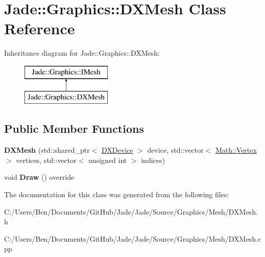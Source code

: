 \hypertarget{class_jade_1_1_graphics_1_1_d_x_mesh}{}\section{Jade\+:\+:Graphics\+:\+:D\+X\+Mesh Class Reference}
\label{class_jade_1_1_graphics_1_1_d_x_mesh}
Inheritance diagram for Jade\+:\+:Graphics\+:\+:D\+X\+Mesh\+:\begin{figure}[H]
\begin{center}
\leavevmode
\includegraphics[height=2.000000cm]{class_jade_1_1_graphics_1_1_d_x_mesh}
\end{center}
\end{figure}
\subsection*{Public Member Functions}
\begin{DoxyCompactItemize}
\item 
\hypertarget{class_jade_1_1_graphics_1_1_d_x_mesh_a4440d9c0e2b5f72d583ec4ea378ea52d}{}{\bfseries D\+X\+Mesh} (std\+::shared\+\_\+ptr$<$ \hyperlink{class_jade_1_1_graphics_1_1_d_x_device}{D\+X\+Device} $>$ device, std\+::vector$<$ \hyperlink{struct_jade_1_1_math_1_1_vertex}{Math\+::\+Vertex} $>$ vertices, std\+::vector$<$ unsigned int $>$ indices)\label{class_jade_1_1_graphics_1_1_d_x_mesh_a4440d9c0e2b5f72d583ec4ea378ea52d}

\item 
\hypertarget{class_jade_1_1_graphics_1_1_d_x_mesh_a61dc93ef90c912c08cb5b7aaf33d234c}{}void {\bfseries Draw} () override\label{class_jade_1_1_graphics_1_1_d_x_mesh_a61dc93ef90c912c08cb5b7aaf33d234c}

\end{DoxyCompactItemize}


The documentation for this class was generated from the following files\+:\begin{DoxyCompactItemize}
\item 
C\+:/\+Users/\+Ben/\+Documents/\+Git\+Hub/\+Jade/\+Jade/\+Source/\+Graphics/\+Mesh/D\+X\+Mesh.\+h\item 
C\+:/\+Users/\+Ben/\+Documents/\+Git\+Hub/\+Jade/\+Jade/\+Source/\+Graphics/\+Mesh/D\+X\+Mesh.\+cpp\end{DoxyCompactItemize}
